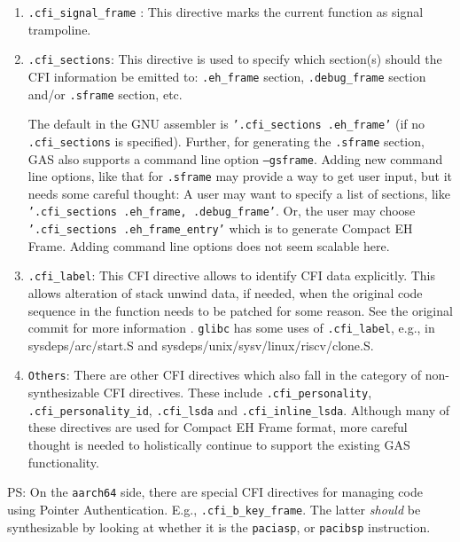 \documentclass{article} \usepackage[a4paper, total={6in, 8in}]{geometry}
\begin{document}
\begin{enumerate}

\item \texttt{.cfi\_signal\_frame} : This directive marks the current function
as signal trampoline.

\item \texttt{.cfi\_sections}: This directive is used to specify which
section(s) should the CFI information be emitted to: \texttt{.eh\_frame}
section, \texttt{.debug\_frame} section and/or \texttt{.sframe} section, etc.

The default in the GNU assembler is \texttt{'.cfi\_sections .eh\_frame'} (if no
\texttt{.cfi\_sections} is specified). Further, for generating the
\texttt{.sframe} section, GAS also supports a command line option
\texttt{--gsframe}.  Adding new command line options, like that for
\texttt{.sframe} may provide a way to get user input, but it needs some careful
thought: A user may want to specify a list of sections, like
\texttt{'.cfi\_sections .eh\_frame, .debug\_frame'}.  Or, the user may choose
\texttt{'.cfi\_sections .eh\_frame\_entry'} which is to generate Compact EH
Frame.  Adding command line options does not seem scalable here.
 
\item \texttt{.cfi\_label}:  This CFI directive allows to identify CFI data
explicitly.   This allows alteration of stack unwind data, if needed, when the
original code sequence in the function needs to be patched for some reason.
See the original commit for more information \cite{CFILABELCOMMIT}.
\texttt{glibc} has some uses of \texttt{.cfi\_label}, e.g., in
sysdeps/arc/start.S and sysdeps/unix/sysv/linux/riscv/clone.S.

\item \texttt{Others}: There are other CFI directives which also fall in the
category of non-synthesizable CFI directives.  These include
\texttt{.cfi\_personality}, \texttt{.cfi\_personality\_id}, \texttt{.cfi\_lsda}
and \texttt{.cfi\_inline\_lsda}.  Although many of these directives are used
for Compact EH Frame format, more careful thought is needed to holistically
continue to support the existing GAS functionality.

\end{enumerate}

PS: On the \texttt{aarch64} side, there are special CFI directives for managing
code using Pointer Authentication. E.g.,
     \texttt{.cfi\_b\_key\_frame}\cite{CFIPSEUDOAARCH64}.  The
latter \emph{should} be synthesizable by looking at whether it is the
\texttt{paciasp}, or \texttt{pacibsp} instruction.
\end{document}
